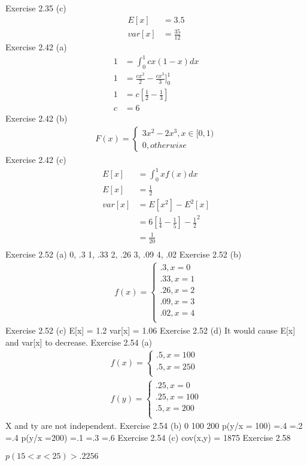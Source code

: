 \documentclass[10pt, oneside]{article}
\begin{document}
\clearpage
\pagebreak
Exercise 2.35 (c)
\begin{align}
E[x] & = 3.5 \\
var[x] & =\frac{35}{12}
\end{align}
\clearpage
\pagebreak
Exercise 2.42 (a)
\begin{align}
1& = \int_{0}^{1} cx(1-x)dx\\
1&= \frac{cx^{2}}{2}-\frac{cx^{3}}{3}]_{0}^{1} \\
1&= c[\frac{1}{2} -\frac{1}{3}] \\
c&= 6
\end{align}
\clearpage
\pagebreak
Exercise 2.42 (b)
\begin{align*}
F(x) = \begin{cases} 3x^{2} -2x^{3}, x \in [0,1) \\
0, otherwise
\end{cases}
\end{align*}
\clearpage
\pagebreak
Exercise 2.42 (c)
\begin{align*}
E[x]  & = \int_{0}^{1} x f(x) dx \\
E[x] &= \frac{1}{2} \\
var[x] & = E[x^{2}] -E^{2} [x] \\
& =  6[\frac{1}{4}-\frac{1}{5}] - \frac{1}{2} ^{2} \\
& = \frac{1}{20} \\
\end{align*}
\clearpage
\pagebreak
Exercise 2.52 (a)
0, .3
1, .33
2, .26
3, .09
4, .02
\pagebreak
Exercise 2.52 (b)
\begin{align*}
f(x) = \begin{cases} .3, x=0 \\
.33, x=1 \\
.26, x=2 \\
.09, x=3 \\
.02, x=4 \\
\end{cases}
\end{align*}
\clearpage
\pagebreak
Exercise 2.52 (c)
E[x] = 1.2
var[x] = 1.06
\clearpage
\pagebreak
Exercise 2.52 (d)
It would cause E[x] and var[x] to decrease.
\clearpage
\pagebreak
Exercise 2.54  (a)
\begin{align*}
f(x) = \begin{cases} .5, x=100 \\
.5, x=250 \\
\end{cases} \\
f(y) = \begin{cases} .25, x=0 \\
.25, x=100 \\
.5, x=200 \\
\end{cases}
\end{align*}
X and ty are not independent.
\clearpage
\pagebreak
Exercise 2.54 (b)
              0 100 200
p(y/x = 100) =.4 =.2 =.4
p(y/x =200) =.1 =.3 =.6
\clearpage
\pagebreak
Exercise 2.54 (c)
cov(x,y) = 1875
\clearpage
\pagebreak
Exercise 2.58 

$p(15 < x < 25) > .2256$
\end{document}
